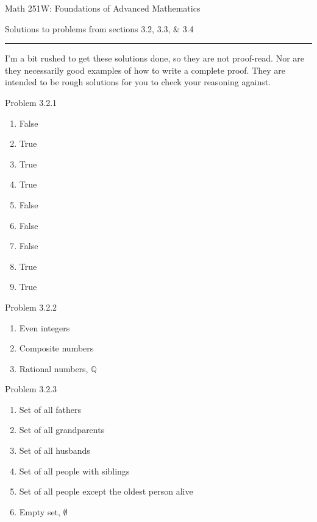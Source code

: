 \documentclass{article}
\theoremstyle{definition}
\newcommand{\Q}{\mathbb{Q}}
\begin{document}
	\begin{center}
		\Large{Math 251W: Foundations of Advanced Mathematics}

		\normalsize Solutions to problems from sections 3.2, 3.3, $\&$ 3.4
		\hrule \vspace{0.4cm}

		I'm a bit rushed to get these solutions done, so they are not
		proof-read. Nor are they necessarily good examples of how to write
		a complete proof. They are intended to be rough solutions for you
		to check your reasoning against.

		\vspace{0.75cm}
	\end{center}


	\noindent Problem 3.2.1  \vspace{0.3cm}

	\begin{enumerate}
		\item False
		\item True
		\item True
		\item True
		\item False
		\item False
		\item False
		\item True
		\item True
	\end{enumerate}

	\vspace{1cm}


	\noindent Problem 3.2.2  \vspace{0.3cm}

	\begin{enumerate}
		\item Even integers
		\item Composite numbers
		\item Rational numbers, $\Q$
	\end{enumerate}

	\vspace{1cm}


	\noindent Problem 3.2.3  \vspace{0.3cm}

	\begin{enumerate}
		\item Set of all fathers
		\item Set of all grandparents
		\item Set of all husbands
		\item Set of all people with siblings
		\item Set of all people except the oldest person alive
		\item Empty set, $\emptyset$
	\end{enumerate}
\end{document}
